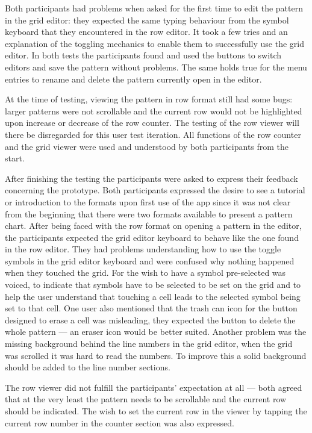 Both participants had problems when asked for the first time to edit the pattern in the grid editor: they expected the same typing behaviour from the symbol keyboard that they encountered in the row editor. It took a few tries and an explanation of the toggling mechanics to enable them to successfully use the grid editor. In both tests the participants found and used the buttons to switch editors and save the pattern without problems. The same holds true for the menu entries to rename and delete the pattern currently open in the editor.

At the time of testing, viewing the pattern in row format still had some bugs: larger patterns were not scrollable and the current row would not be highlighted upon increase or decrease of the row counter. The testing of the row viewer will there be disregarded for this user test iteration. All functions of the row counter and the grid viewer were used and understood by both participants from the start. 

After finishing the testing the participants were asked to express their feedback concerning the prototype. Both participants expressed the desire to see a tutorial or introduction to the formats upon first use of the app since it was not clear from the beginning that there were two formats available to present a pattern chart. After being faced with the row format on opening a pattern in the editor, the participants expected the grid editor keyboard to behave like the one found in the row editor. They had problems understanding how to use the toggle symbols in the grid editor keyboard and were confused why nothing happened when they touched the grid. For the wish to have a symbol pre-selected was voiced, to indicate that symbols have to be selected to be set on the grid and to help the user understand that touching a cell leads to the selected symbol being set to that cell. One user also mentioned that the trash can icon for the button designed to erase a cell was misleading, they expected the button to delete the whole pattern --- an eraser icon would be better suited. Another problem was the missing background behind the line numbers in the grid editor, when the grid was scrolled it was hard to read the numbers. To improve this a solid background should be added to the line number sections. 

The row viewer did not fulfill the participants' expectation at all --- both agreed that at the very least the pattern needs to be scrollable and the current row should be indicated. The wish to set the current row in the viewer by tapping the current row number in the counter section was also expressed.

